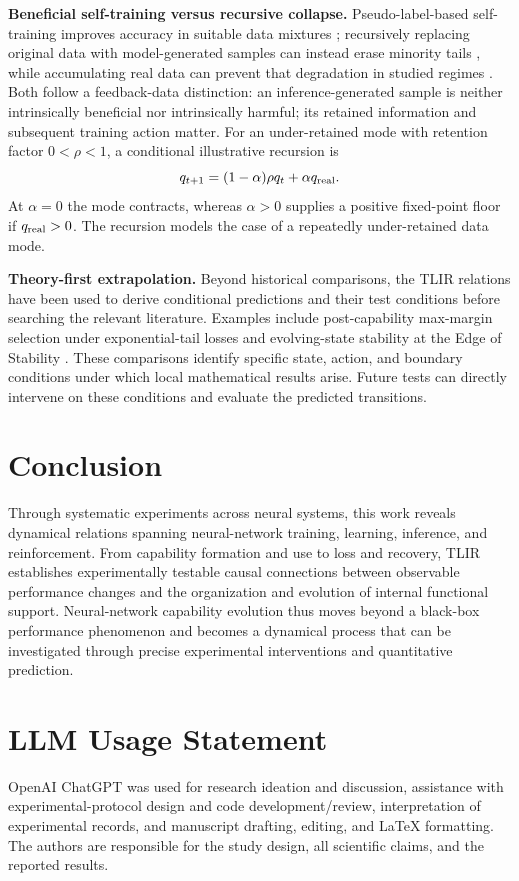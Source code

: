 \documentclass[10pt,twocolumn,letterpaper]{article}
\begin{document}
\noindent\textbf{Beneficial self-training versus recursive collapse.}
Pseudo-label-based self-training improves accuracy in suitable data mixtures \cite{xie2020}; recursively replacing original data with model-generated samples can instead erase minority tails \cite{shumailov2024}, while accumulating real data can prevent that degradation in studied regimes \cite{gerstgrasser2024}. Both follow a feedback-data distinction: an inference-generated sample is neither intrinsically beneficial nor intrinsically harmful; its retained information and subsequent training action matter. For an under-retained mode with retention factor $0<\rho<1$, a conditional illustrative recursion is
\begin{equation}
 q_{t+1}=(1-\alpha)\rho q_t+\alpha q_{\rm real}.
 \label{eq:feedback}
\end{equation}
At $\alpha=0$ the mode contracts, whereas $\alpha>0$ supplies a positive fixed-point floor if $q_{\rm real}>0$. The recursion models the case of a repeatedly under-retained data mode.

\noindent\textbf{Theory-first extrapolation.}
Beyond historical comparisons, the TLIR relations have been used to derive conditional predictions and their test conditions before searching the relevant literature. Examples include post-capability max-margin selection under exponential-tail losses \cite{soudry2018} and evolving-state stability at the Edge of Stability \cite{cohen2021}. These comparisons identify specific state, action, and boundary conditions under which local mathematical results arise. Future tests can directly intervene on these conditions and evaluate the predicted transitions.

\section{Conclusion}
Through systematic experiments across neural systems, this work reveals dynamical relations spanning neural-network training, learning, inference, and reinforcement. From capability formation and use to loss and recovery, TLIR establishes experimentally testable causal connections between observable performance changes and the organization and evolution of internal functional support. Neural-network capability evolution thus moves beyond a black-box performance phenomenon and becomes a dynamical process that can be investigated through precise experimental interventions and quantitative prediction.

\section*{LLM Usage Statement}
OpenAI ChatGPT was used for research ideation and discussion, assistance with experimental-protocol design and code development/review, interpretation of experimental records, and manuscript drafting, editing, and LaTeX formatting. The authors are responsible for the study design, all scientific claims, and the reported results.


{\small


}
\end{document}
